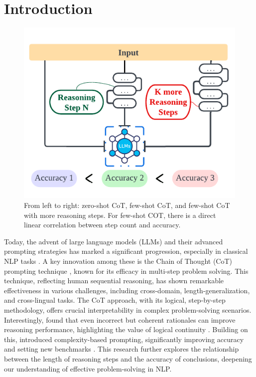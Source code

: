 \documentclass[11pt]{article}
\begin{document}
\section{Introduction}
\begin{figure}[t]
    \centering
    \includegraphics[width=0.9\columnwidth]{add.pdf}
    \caption{From left to right: zero-shot CoT, few-shot CoT, and few-shot CoT with more reasoning steps. For few-shot COT, there is a direct linear correlation between step count and accuracy.}
    \label{fig:steps-connection-with-accuracy}
\end{figure}
Today, the advent of large language models (LLMs) and their advanced prompting strategies has marked a significant progression, especially in classical NLP tasks \cite{kojima2023large,wei2022chain,shao2023synthetic,lyu2023faithful, jin2024exploring}. A key innovation among these is the Chain of Thought (CoT) prompting technique \cite{kojima2023large,wang2023selfconsistency,zhang2022automatic}, known for its efficacy in multi-step problem solving. This technique, reflecting human sequential reasoning, has shown remarkable effectiveness in various challenges, including cross-domain, length-generalization, and cross-lingual tasks. The CoT approach, with its logical, step-by-step methodology, offers crucial interpretability in complex problem-solving scenarios. Interestingly, \citeauthor{wang2023selfconsistency} found that even incorrect but coherent rationales can improve reasoning performance, highlighting the value of logical continuity \cite{wang2023selfconsistency}. Building on this, \citeauthor{fu2023complexitybased} introduced complexity-based prompting, significantly improving accuracy and setting new benchmarks \cite{fu2023complexitybased}. This research further explores the relationship between the length of reasoning steps and the accuracy of conclusions, deepening our understanding of effective problem-solving in NLP.
\end{document}
